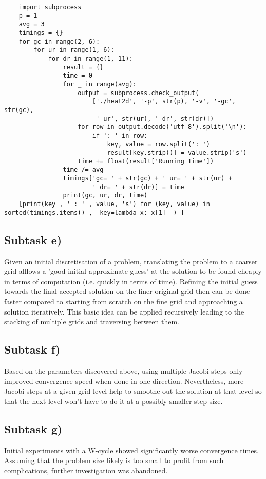 \documentclass[11pt,a4paper]{article}
\begin{document}
\lstset{language=Python}
\begin{lstlisting}
	import subprocess
	p = 1
	avg = 3
	timings = {}
	for gc in range(2, 6):
		for ur in range(1, 6):
			for dr in range(1, 11):
				result = {}
				time = 0
				for _ in range(avg):
					output = subprocess.check_output(
						['./heat2d', '-p', str(p), '-v', '-gc', str(gc),
						 '-ur', str(ur), '-dr', str(dr)])
					for row in output.decode('utf-8').split('\n'):
						if ': ' in row:
							key, value = row.split(': ')
							result[key.strip()] = value.strip('s')
					time += float(result['Running Time'])
				time /= avg
				timings['gc= ' + str(gc) + ' ur= ' + str(ur) +
						' dr= ' + str(dr)] = time
				print(gc, ur, dr, time)
	[print(key , ' : ' , value, 's') for (key, value) in sorted(timings.items() ,  key=lambda x: x[1]  ) ]
\end{lstlisting}


\subsection{Subtask e)}
Given an initial discretisation of a problem, translating the problem to a coarser grid alllows 
a 'good initial approximate guess' at the solution to be found cheaply in terms of computation (i.e. quickly in terms of time).
Refining the initial guess towards the final accepted solution on the finer original grid then can be done 
faster compared to starting from scratch on the fine grid and approaching a solution iteratively.
This basic idea can be applied recursively leading to the stacking of multiple grids and traversing between them.

\subsection{Subtask f)}
Based on the parameters discovered above, using multiple Jacobi steps only improved convergence
speed when done in one direction. Nevertheless, more Jacobi steps at a given grid level help to smoothe out the
solution at that level so that the next level won't have to do it at a possibly smaller step size.

\subsection{Subtask g)}
Initial experiments with a W-cycle showed significantly worse convergence times.
Assuming that the problem size likely is too small to profit from such complications,
further investigation was abandoned.
\end{document}
